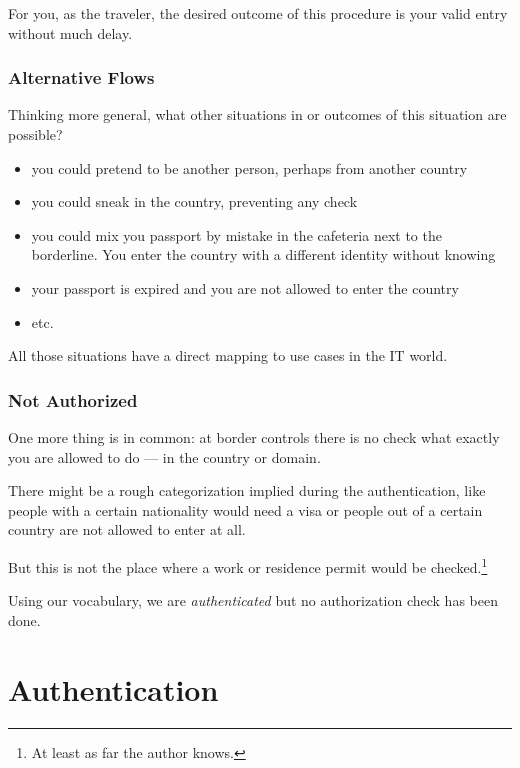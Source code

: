 \documentclass[11pt]{report}
\begin{document}
For you, as the traveler, the desired outcome of this procedure is your
valid entry without much delay.


\subsection{Alternative Flows}

Thinking more general, what other situations in or outcomes of this
situation are possible?

\begin{itemize}
    \item you could pretend to be another person, perhaps from another 
        country
    \item you could sneak in the country, preventing any check
    \item you could mix you passport by mistake in the cafeteria next 
        to the borderline.  You enter the country with a different identity 
        without knowing
    \item your passport is expired and you are not allowed to enter the 
        country
    \item etc.
\end{itemize}

All those situations have a direct mapping to use cases in the IT world.


\subsection{Not Authorized}

One more thing is in common: at border controls there is no check what
exactly you are allowed to do --- in the country or domain.

There might be a rough categorization implied during the authentication,
like people with a certain nationality would need a visa or people out
of a certain country are not allowed to enter at all.

But this is not the place where a work or residence permit would be
checked.\footnote{At least as far the author knows.}

Using our vocabulary, we are \emph{authenticated} but no authorization
check has been done.


\chapter{Authentication}
\end{document}
